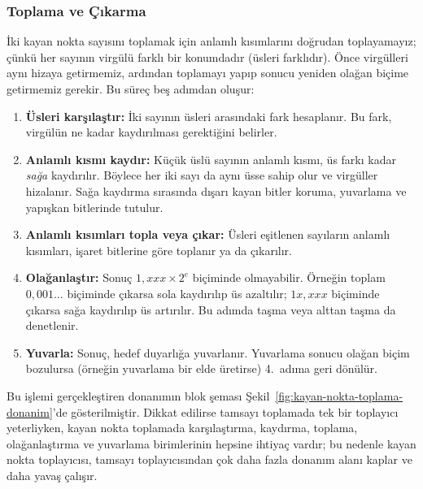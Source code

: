 \subsubsection{Toplama ve Çıkarma}

İki kayan nokta sayısını toplamak için anlamlı kısımlarını doğrudan toplayamayız; çünkü her sayının virgülü farklı bir konumdadır (üsleri farklıdır). Önce virgülleri aynı hizaya getirmemiz, ardından toplamayı yapıp sonucu yeniden olağan biçime getirmemiz gerekir. Bu süreç beş adımdan oluşur:

\begin{enumerate}
\item \textbf{Üsleri karşılaştır:} İki sayının üsleri arasındaki fark hesaplanır. Bu fark, virgülün ne kadar kaydırılması gerektiğini belirler.

\item \textbf{Anlamlı kısmı kaydır:} Küçük üslü sayının anlamlı kısmı, üs farkı kadar \emph{sağa} kaydırılır. Böylece her iki sayı da aynı üsse sahip olur ve virgüller hizalanır. Sağa kaydırma sırasında dışarı kayan bitler koruma, yuvarlama ve yapışkan bitlerinde tutulur.

\item \textbf{Anlamlı kısımları topla veya çıkar:} Üsleri eşitlenen sayıların anlamlı kısımları, işaret bitlerine göre toplanır ya da çıkarılır.

\item \textbf{Olağanlaştır:} Sonuç $1{,}xxx \times 2^e$ biçiminde olmayabilir. Örneğin toplam $0{,}001\ldots$ biçiminde çıkarsa sola kaydırılıp üs azaltılır; $1x{,}xxx$ biçiminde çıkarsa sağa kaydırılıp üs artırılır. Bu adımda taşma veya alttan taşma da denetlenir.

\item \textbf{Yuvarla:} Sonuç, hedef duyarlığa yuvarlanır. Yuvarlama sonucu olağan biçim bozulursa (örneğin yuvarlama bir elde üretirse) 4.~adıma geri dönülür.
\end{enumerate}

Bu işlemi gerçekleştiren donanımın blok şeması Şekil~\ref{fig:kayan-nokta-toplama-donanim}'de gösterilmiştir. Dikkat edilirse tamsayı toplamada tek bir toplayıcı yeterliyken, kayan nokta toplamada karşılaştırma, kaydırma, toplama, olağanlaştırma ve yuvarlama birimlerinin hepsine ihtiyaç vardır; bu nedenle kayan nokta toplayıcısı, tamsayı toplayıcısından çok daha fazla donanım alanı kaplar ve daha yavaş çalışır.


